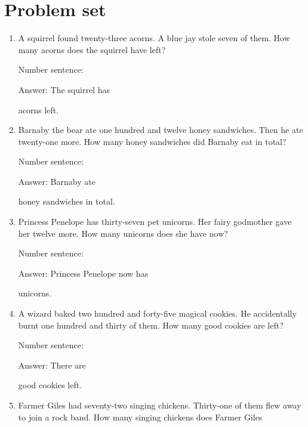 \documentclass{tufte-book}
\begin{document}
\clearpage\section{Problem set }

\begin{enumerate}

\item
  A squirrel found twenty-three acorns. A blue jay stole seven of them.
  How many acorns does the squirrel have left?\medskip\par
  Number sentence:
  \dotfill\medskip\par
  Answer: The squirrel has
  \dotfill\medskip\par\mbox{}\dotfill\medskip\par\mbox{}\dotfill\bigskip
  acorns left.
\item
  Barnaby the bear ate one hundred and twelve honey sandwiches. Then he
  ate twenty-one more. How many honey sandwiches did Barnaby eat in
  total?\medskip\par
  Number sentence:
  \dotfill\medskip\par
  Answer: Barnaby ate
  \dotfill\medskip\par\mbox{}\dotfill\medskip\par\mbox{}\dotfill\bigskip
  honey sandwiches in total.
\item
  Princess Penelope has thirty-seven pet unicorns. Her fairy godmother
  gave her twelve more. How many unicorns does she have now?\medskip\par
  Number sentence:
  \dotfill\medskip\par
  Answer: Princess Penelope now has
  \dotfill\medskip\par\mbox{}\dotfill\medskip\par\mbox{}\dotfill\bigskip
  unicorns.
\item
  A wizard baked two hundred and forty-five magical cookies. He
  accidentally burnt one hundred and thirty of them. How many good
  cookies are left?\medskip\par
  Number sentence:
  \dotfill\medskip\par
  Answer: There are
  \dotfill\medskip\par\mbox{}\dotfill\medskip\par\mbox{}\dotfill\bigskip
  good cookies left.
\item
  Farmer Giles had seventy-two singing chickens. Thirty-one of them flew
  away to join a rock band. How many singing chickens does Farmer Giles

\end{enumerate}
\end{document}
